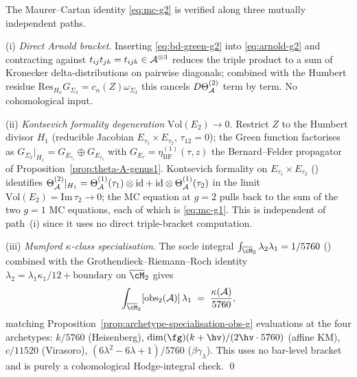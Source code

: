 \begin{corollary}
\label{cor:theta-A-g2-three-paths}
The Maurer--Cartan identity \eqref{eq:mc-g2} is verified along three
mutually independent paths.

\textup{(i) \emph{Direct Arnold bracket}.} Inserting
\eqref{eq:bd-green-g2} into \eqref{eq:arnold-g2} and contracting
against $t_{ij}t_{jk}=t_{ijk}\in\mathcal{A}^{\otimes 3}$ reduces the triple
product to a sum of Kronecker delta-distributions on pairwise
diagonals; combined with the Humbert residue
$\mathrm{Res}_{H_n}G_{\Sigma_2}=c_n(Z)\omega_{\Sigma_2}$ this cancels
$D\Theta_{\mathcal{A}}^{(2)}$ term by term. No cohomological input.

\textup{(ii) \emph{Kontsevich formality degeneration}
$\mathrm{Vol}(E_2)\to 0$}. Restrict $Z$ to the Humbert divisor $H_1$
\textup{(}reducible Jacobian $E_{\tau_1}\times E_{\tau_2}$,
$\tau_{12}=0$\textup{)}; the Green function factorises as
$G_{\Sigma_2}\vert_{H_1}=G_{E_{\tau_1}}\oplus G_{E_{\tau_2}}$ with
$G_{E_\tau}=\eta^{(1)}_{\mathrm{BF}}(\tau,z)$ the Bernard--Felder
propagator of Proposition~\ref{prop:theta-A-genus1}. Kontsevich
formality on $E_{\tau_1}\times E_{\tau_2}$
\textup{(}\cite[§6]{CEE10}\textup{)} identifies
$\Theta_{\mathcal{A}}^{(2)}\vert_{H_1}=\Theta_{\mathcal{A}}^{(1)}(\tau_1)\otimes
\mathrm{id}+\mathrm{id}\otimes\Theta_{\mathcal{A}}^{(1)}(\tau_2)$ in the
limit $\mathrm{Vol}(E_2)=\mathrm{Im}\,\tau_2\to 0$; the MC equation
at $g=2$ pulls back to the sum of the two $g=1$ MC equations, each
of which is \eqref{eq:mc-g1}. This is independent of path~(i) since
it uses no direct triple-bracket computation.

\textup{(iii) \emph{Mumford $\kappa$-class specialisation}}. The
socle integral $\int_{\overline{\cM}_2}\lambda_2\lambda_1=1/5760$
\textup{(}\cite{Mumford83}\textup{)} combined with the
Grothendieck--Riemann--Roch identity
$\lambda_2=\lambda_1\kappa_1/12+\text{boundary}$ on
$\overline{\cM}_2$ gives
\begin{equation}\label{eq:obs-g2-archetype-check}
\int_{\overline{\cM}_2}[\mathrm{obs}_2(\cA)]\,\lambda_1
\;=\;
\frac{\kscal(\cA)}{5760},
\end{equation}
matching Proposition~\ref{prop:archetype-specialisation-obs-g}
evaluations at the four archetypes:
$k/5760$ \textup{(}Heisenberg\textup{)},
$\dim(\fg)(k+\hv)/(2\hv\cdot 5760)$ \textup{(}affine KM\textup{)},
$c/11520$ \textup{(}Virasoro\textup{)},
$(6\lambda^2-6\lambda+1)/5760$ \textup{(}$\beta\gamma_\lambda$\textup{)}.
This uses no bar-level bracket and is purely a cohomological
Hodge-integral check. \qed
\end{corollary}


